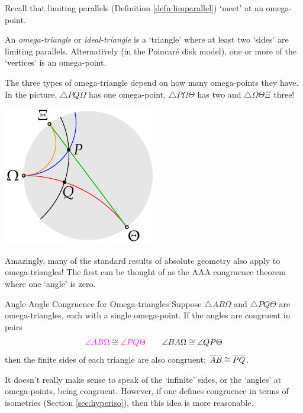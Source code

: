 \begin{minipage}[t]{0.7\linewidth}\vspace{-5pt}
	Recall that limiting parallels (Definition \ref{defn:limparallel}) `meet' at an omega-point.
	
	\begin{defn}{}{}
		An \emph{omega-triangle} or \emph{ideal-triangle} is a `triangle' where at least two `sides' are limiting parallels. Alternatively (in the Poincaré disk model), one or more of the `vertices' is an omega-point.
	\end{defn}
	
	The three types of omega-triangle depend on how many omega-points they have. In the picture, $\triangle PQ\Omega$ has one omega-point, $\triangle P\Omega\Theta$ has two and $\triangle \Omega\Theta\Xi$ three!
\end{minipage}
\hfill
\begin{minipage}[t]{0.28\linewidth}\vspace{-5pt}
	\flushright\includegraphics{omega-example}
\end{minipage}\smallbreak
Amazingly, many of the standard results of absolute geometry also apply to omega-triangles! The first can be thought of as the AAA congruence theorem where one `angle' is zero.

\begin{thm}{Angle-Angle Congruence for Omega-triangles}{}
	Suppose $\triangle AB\Omega$ and $\triangle PQ\Theta$ are omega-triangles, each with a single omega-point. If the angles are congruent in pairs
	\[
		\textcolor{Magenta}{\angle AB\Omega} \cong \textcolor{Magenta}{\angle PQ\Theta} \qquad \angle BA\Omega \cong\angle QP\Theta
	\]
	then the finite sides of each triangle are also congruent: $\overline{AB}\cong\overline{PQ}$.
\end{thm}

It doesn't really make sense to speak of the `infinite' sides, or the `angles' at omega-points, being congruent. However, if one defines congruence in terms of isometries (Section \ref{sec:hyperiso}), then this idea is more reasonable.

